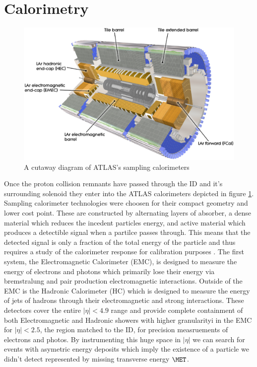 \section{Calorimetry} \label{sec:atlas:calorimetry}

\begin{figure}[!htbp]
  \begin{center}
    \includegraphics[width=0.8\linewidth]{figures/atlas/calorimeter_cutaway}
    \caption{ \cite{PERF-2007-01} A cutaway diagram of ATLAS's sampling calorimeters}
    \label{fig:calorimeter_cutaway}
  \end{center}
\end{figure}

Once the proton collision remnants have passed through the ID and it's
surrounding solenoid they enter into the ATLAS calorimeters depicted in figure
\ref{fig:calorimeter_cutaway}.  Sampling calorimeter technologies were choosen
for their compact geometry and lower cost point.  These are constructed by
alternating layers of absorber, a dense material which reduces the incedent
particles energy, and active material which produces a detectible signal when a
partilce passes through.  This means that the detected signal is only a fraction
of the total energy of the particle and thus requires a study of the calorimeter
response for calibration purposes \cite{Fabjan:692252}. The first system, the
Electromagnetic Calorimeter (EMC), is designed to measure the energy of
electrons and photons which primarily lose their energy via bremstralung and
pair production electromagnetic interactions.  Outside of the EMC is the
Hadronic Calorimeter (HC) which is designed to measure the energy of jets of
hadrons through their electromagnetic and strong interactions. These detectors
cover the entire $|\eta| < 4.9$ range and provide complete containment of both
Electromagnetic and Hadronic showers with higher granularityi in the EMC for
$|\eta| < 2.5$, the region matched to the ID, for precision measruements of
electrons and photos.  By instrumenting this huge space in $|\eta|$ we can
search for events with asymetric energy deposits which imply the existence of a
particle we didn't detect represented by missing transverse energy $\MET$.

